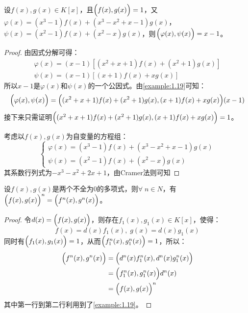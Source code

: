 \begin{theorem}
	设$f(x),g(x)\in K[x]$，且$\Bigl(f(x),g(x)\Bigr)=1$，又$\varphi(x)=(x^3-1)f(x)+(x^3-x^2+x-1)g(x)$，$\psi(x)=(x^2-1)f(x)+(x^2-x)g(x)$，则$\Bigl(\varphi(x),\psi(x)\Bigr)=x-1$。
\end{theorem}
\begin{proof}
	由因式分解可得：
	\begin{gather*}
		\varphi(x)=(x-1)[(x^2+x+1)f(x)+(x^2+1)g(x)] \\
		\psi(x)=(x-1)[(x+1)f(x)+xg(x)]
	\end{gather*}
	所以$x-1$是$\varphi(x)$和$\psi(x)$的一个公因式。由\cref{example:1.19}可知：
	\begin{equation*}
		\Bigl(\varphi(x),\psi(x)\Bigr)=\Bigl((x^2+x+1)f(x)+(x^2+1)g(x),(x+1)f(x)+xg(x)\Bigr)(x-1)
	\end{equation*}
	接下来只需证明$\Bigl((x^2+x+1)f(x)+(x^2+1)g(x),(x+1)f(x)+xg(x)\Bigr)=1$。\par
	考虑以$f(x),g(x)$为自变量的方程组：
	\begin{equation*}
		\begin{cases}
			\varphi(x)=(x^3-1)f(x)+(x^3-x^2+x-1)g(x) \\
			\psi(x)=(x^2-1)f(x)+(x^2-x)g(x)
		\end{cases}
	\end{equation*}
	其系数行列式为$-x^3-x^2+2x+1$，由Cramer法则可知
\end{proof}
\begin{theorem}
	设$f(x),g(x)$是两个不全为$0$的多项式，则$\forall\;n\in N$，有$\Bigl(f(x),g(x)\Bigr)^n=\Bigl(f^n(x),g^n(x)\Bigr)$。
\end{theorem}
\begin{proof}
	令$d(x)=\Bigl(f(x),g(x)\Bigr)$，则存在$f_1(x),g_1(x)\in K[x]$，使得：
	\begin{equation*}
		f(x)=d(x)f_1(x),\;g(x)=d(x)g_1(x)
	\end{equation*}
	同时有$\Bigl(f_1(x),g_1(x)\Bigr)=1$，从而$\Bigl(f_1^n(x),g_1^n(x)\Bigr)=1$，所以：
	\begin{align*}
		\Bigl(f^n(x),g^n(x)\Bigr)
		&=\Bigl(d^n(x)f_1^n(x),d^n(x)g_1^n(x)\Bigr) \\
		&=\Bigl(f_1^n(x),g_1^n(x)\Bigr)d^n(x) \\
		&=\Bigl(f(x),g(x)\Bigr)^n
	\end{align*}
	其中第一行到第二行利用到了\cref{example:1.19}。
\end{proof}
